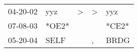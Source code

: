 \begin{supertabular}{p{0.07\textwidth}p{0.06\textwidth}p{0.02\textwidth}p{0.02\textwidth}p{0.06\textwidth}}
 04-20-02\textsuperscript{} &   yyz\textsuperscript{} &  \textgreater &  \textgreater &   yyz\textsuperscript{} \\
 07-08-03\textsuperscript{} &                   *OE2* &               &               &                   *CE2* \\
 05-20-04\textsuperscript{} &  SELF\textsuperscript{} &               &             , &  BRDG\textsuperscript{} \\
\end{supertabular}
